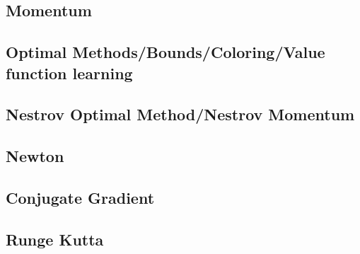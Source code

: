 
\subsection{Momentum}

\subsection{Optimal Methods/Bounds/Coloring/Value function learning}

\subsection{Nestrov Optimal Method/Nestrov Momentum}

\subsection{Newton}

\subsection{Conjugate Gradient}

\subsection{Runge Kutta}



\endinput